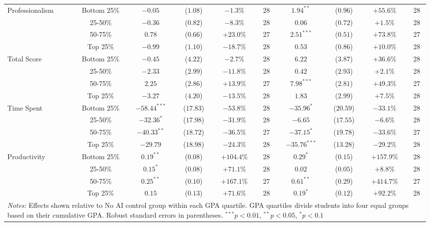 \begin{table}[!htbp]
\begin{tabular}{lccccccccc}
\hline
\multirow{4}{*}{Professionalism} & Bottom 25\% & $-0.05$ & ($1.08$) & $-1.3\%$ & 28 & $1.94^{**}$ & ($0.96$) & $+55.6\%$ & 28 \\
& 25-50\% & $-0.36$ & ($0.82$) & $-8.3\%$ & 28 & $0.06$ & ($0.72$) & $+1.5\%$ & 28 \\
& 50-75\% & $0.78$ & ($0.66$) & $+23.0\%$ & 27 & $2.51^{***}$ & ($0.51$) & $+73.8\%$ & 27 \\
& Top 25\% & $-0.99$ & ($1.10$) & $-18.7\%$ & 28 & $0.53$ & ($0.86$) & $+10.0\%$ & 28 \\
\hline
\multirow{4}{*}{Total Score} & Bottom 25\% & $-0.45$ & ($4.22$) & $-2.7\%$ & 28 & $6.22$ & ($3.87$) & $+36.6\%$ & 28 \\
& 25-50\% & $-2.33$ & ($2.99$) & $-11.8\%$ & 28 & $0.42$ & ($2.93$) & $+2.1\%$ & 28 \\
& 50-75\% & $2.25$ & ($2.86$) & $+13.9\%$ & 27 & $7.98^{***}$ & ($2.81$) & $+49.3\%$ & 27 \\
& Top 25\% & $-3.27$ & ($4.20$) & $-13.5\%$ & 28 & $1.83$ & ($2.99$) & $+7.5\%$ & 28 \\
\hline
\multirow{4}{*}{Time Spent} & Bottom 25\% & $-58.44^{***}$ & ($17.83$) & $-53.8\%$ & 28 & $-35.96^{*}$ & ($20.59$) & $-33.1\%$ & 28 \\
& 25-50\% & $-32.36^{*}$ & ($17.98$) & $-31.9\%$ & 28 & $-6.65$ & ($17.55$) & $-6.6\%$ & 28 \\
& 50-75\% & $-40.33^{**}$ & ($18.72$) & $-36.5\%$ & 27 & $-37.15^{*}$ & ($19.78$) & $-33.6\%$ & 27 \\
& Top 25\% & $-29.79$ & ($18.98$) & $-24.3\%$ & 28 & $-35.76^{***}$ & ($13.28$) & $-29.2\%$ & 28 \\
\hline
\multirow{4}{*}{Productivity} & Bottom 25\% & $0.19^{**}$ & ($0.08$) & $+104.4\%$ & 28 & $0.29^{*}$ & ($0.15$) & $+157.9\%$ & 28 \\
& 25-50\% & $0.15^{*}$ & ($0.08$) & $+71.1\%$ & 28 & $0.02$ & ($0.05$) & $+8.8\%$ & 28 \\
& 50-75\% & $0.25^{**}$ & ($0.10$) & $+167.1\%$ & 27 & $0.61^{**}$ & ($0.29$) & $+414.7\%$ & 27 \\
& Top 25\% & $0.15$ & ($0.13$) & $+71.6\%$ & 28 & $0.19^{*}$ & ($0.12$) & $+92.2\%$ & 28 \\
\hline
\multicolumn{10}{p{0.95\linewidth}}{\footnotesize \textit{Notes:} Effects shown relative to No AI control group within each GPA quartile. GPA quartiles divide students into four equal groups based on their cumulative GPA. Robust standard errors in parentheses. $^{***}p<0.01$, $^{**}p<0.05$, $^{*}p<0.1$}
\end{tabular}
\end{table}

